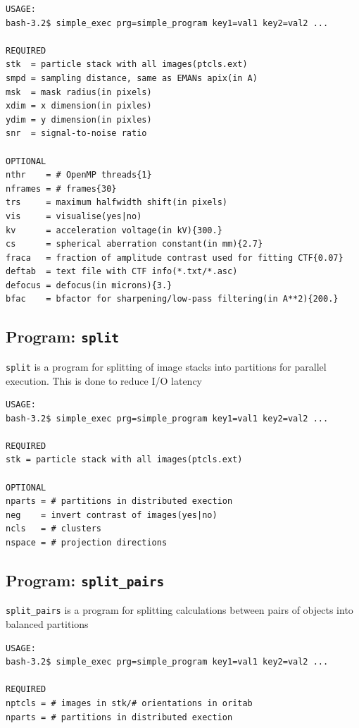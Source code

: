 \documentclass[a4paper,11pt]{article}
\newcommand{\prgname}[1]{\textcolor{NavyBlue}{\texttt{#1}}}
\begin{document}
\begin{verbatim}
USAGE:
bash-3.2$ simple_exec prg=simple_program key1=val1 key2=val2 ...

REQUIRED
stk  = particle stack with all images(ptcls.ext)
smpd = sampling distance, same as EMANs apix(in A)
msk  = mask radius(in pixels)
xdim = x dimension(in pixles)
ydim = y dimension(in pixles)
snr  = signal-to-noise ratio

OPTIONAL
nthr    = # OpenMP threads{1}
nframes = # frames{30}
trs     = maximum halfwidth shift(in pixels)
vis     = visualise(yes|no)
kv      = acceleration voltage(in kV){300.}
cs      = spherical aberration constant(in mm){2.7}
fraca   = fraction of amplitude contrast used for fitting CTF{0.07}
deftab  = text file with CTF info(*.txt/*.asc)
defocus = defocus(in microns){3.}
bfac    = bfactor for sharpening/low-pass filtering(in A**2){200.}
\end{verbatim}

\subsection{Program: \prgname{split}}
\label{split}
\prgname{split} is a program for splitting of image stacks into partitions for parallel execution. This is done to reduce I/O latency

\begin{verbatim}
USAGE:
bash-3.2$ simple_exec prg=simple_program key1=val1 key2=val2 ...

REQUIRED
stk = particle stack with all images(ptcls.ext)

OPTIONAL
nparts = # partitions in distributed exection
neg    = invert contrast of images(yes|no)
ncls   = # clusters
nspace = # projection directions
\end{verbatim}

\subsection{Program: \prgname{split\_pairs}}
\label{split_pairs}
\prgname{split\_pairs} is a program for splitting calculations between pairs of objects into balanced partitions

\begin{verbatim}
USAGE:
bash-3.2$ simple_exec prg=simple_program key1=val1 key2=val2 ...

REQUIRED
nptcls = # images in stk/# orientations in oritab
nparts = # partitions in distributed exection
\end{verbatim}
\end{document}
